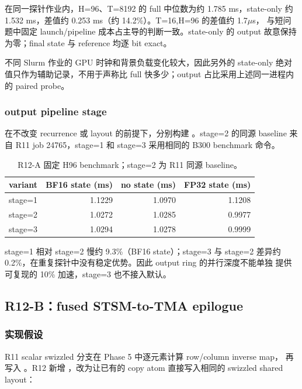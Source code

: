 在同一探针作业内，H=96、T=8192 的 full 中位数为约 1.785 ms，state-only
约 1.532 ms，差值约 0.253 ms（约 14.2\%）。T=16,H=96 的差值约 1.7\(\mu\)s，
与短问题中固定 launch/pipeline 成本占主导的判断一致。state-only 的 output
故意保持为零；final state 与 reference 均逐 bit exact。

不同 Slurm 作业的 GPU 时钟和背景负载变化较大，因此另外的
 state-only 绝对值只作为辅助记录，不用于声称比 full
快多少；output 占比采用上述同一进程内的 paired probe。

\subsubsection{output pipeline stage}

在不改变 recurrence 或 layout 的前提下，分别构建
。stage=2 的同源 baseline
来自 R11 job 24765，stage=1 和 stage=3 采用相同的 B300 benchmark 命令。

\begin{table}[htbp]
\centering
\small
\begin{tabular}{l r r r}
\toprule
variant & BF16 state (ms) & no state (ms) & FP32 state (ms) \\
\midrule
stage=1 & 1.1229 & 1.0970 & 1.1208 \\
stage=2 & 1.0272 & 1.0285 & 0.9977 \\
stage=3 & 1.0294 & 1.0278 & 0.9999 \\
\bottomrule
\end{tabular}
\caption{R12-A 固定 H96 benchmark；stage=2 为 R11 同源 baseline。}
\end{table}

stage=1 相对 stage=2 慢约 9.3\%（BF16 state）；stage=3 与 stage=2 差异约
0.2\%，在重复探针中没有稳定优势。因此 output ring 的并行深度不能单独
提供可复现的 10\% 加速，stage=3 也不接入默认。

\subsection{R12-B：fused STSM-to-TMA epilogue}

\subsubsection{实现假设}

R11 scalar swizzled 分支在 Phase 5 中逐元素计算 row/column inverse map，
再写入 。R12 新增
，改为让已有的
 copy atom 直接写入相同的 swizzled shared
layout：

